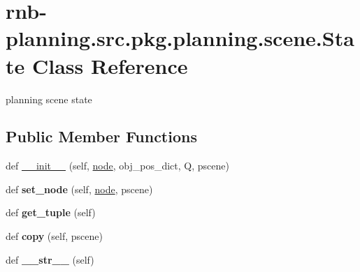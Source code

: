\hypertarget{classrnb-planning_1_1src_1_1pkg_1_1planning_1_1scene_1_1_state}{}\section{rnb-\/planning.src.\+pkg.\+planning.\+scene.\+State Class Reference}
\label{classrnb-planning_1_1src_1_1pkg_1_1planning_1_1scene_1_1_state}


planning scene state  


\subsection*{Public Member Functions}
\begin{DoxyCompactItemize}
\item 
def \hyperlink{classrnb-planning_1_1src_1_1pkg_1_1planning_1_1scene_1_1_state_a1dce175a04c69a1f2648025b161ce8bc}{\+\_\+\+\_\+init\+\_\+\+\_\+} (self, \hyperlink{classrnb-planning_1_1src_1_1pkg_1_1planning_1_1scene_1_1_state_a966f7f8c0a6c3d01869cfa1045b11cd7}{node}, obj\+\_\+pos\+\_\+dict, Q, pscene)
\item 
\mbox{\label{classrnb-planning_1_1src_1_1pkg_1_1planning_1_1scene_1_1_state_a4d4b584161e6fa86f8caa3e5570189ef}} 
def {\bfseries set\+\_\+node} (self, \hyperlink{classrnb-planning_1_1src_1_1pkg_1_1planning_1_1scene_1_1_state_a966f7f8c0a6c3d01869cfa1045b11cd7}{node}, pscene)
\item 
\mbox{\label{classrnb-planning_1_1src_1_1pkg_1_1planning_1_1scene_1_1_state_ac2816026921eaf5769746bd405d7a385}} 
def {\bfseries get\+\_\+tuple} (self)
\item 
\mbox{\label{classrnb-planning_1_1src_1_1pkg_1_1planning_1_1scene_1_1_state_add19df05f30c350a840a65632ebf49b8}} 
def {\bfseries copy} (self, pscene)
\item 
\mbox{\label{classrnb-planning_1_1src_1_1pkg_1_1planning_1_1scene_1_1_state_a42bc27c9d05ba5f03e34ea98e1843366}} 
def {\bfseries \+\_\+\+\_\+str\+\_\+\+\_\+} (self)
\end{DoxyCompactItemize}
